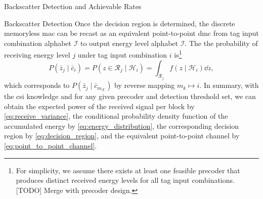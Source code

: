 \documentclass[journal]{IEEEtran}
\begin{document}
\begin{section}{Backscatter Detection and Achievable Rates}
\begin{subsection}{Backscatter Detection}
			Once the decision region is determined, the discrete memoryless \gls{mac} can be recast as an equivalent point-to-point \gls{dmc} from tag input combination alphabet $\mathcal{I}$ to output energy level alphabet $\mathcal{I}$. The the probability of receiving energy level $j$ under tag input combination $i$ is\footnote{For simplicity, we assume there exists at least one feasible precoder that produces distinct received energy levels for all tag input combinations. [TODO] Merge with precoder design.}
			\begin{equation}
				P(\bar{z}_j \mid \bar{c}_i) = P(z \in \mathcal{R}_j \mid \mathcal{H}_i) = \int_{\mathcal{R}_j} f(z \mid \mathcal{H}_i) \dd z,
				\label{eq:point_to_point_channel}
			\end{equation}
			which corresponds to $P(\bar{z}_j \mid \bar{c}_{m_{\mathcal{K}}})$ by reverse mapping $m_k \mapsto i$. In summary, with the \gls{csi} knowledge and for any given precoder and detection threshold set, we can obtain the expected power of the received signal per block by \eqref{eq:receive_variance}, the conditional probability density function of the accumulated energy by \eqref{eq:energy_distribution}, the corresponding decision region by \eqref{eq:decision_region}, and the equivalent point-to-point channel by \eqref{eq:point_to_point_channel}.
		\end{subsection}


\end{section}
\end{document}
